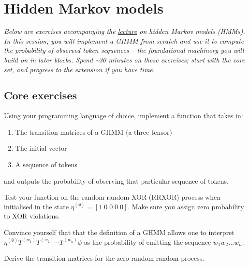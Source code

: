 \documentclass[11pt]{article}
\begin{document}
\section{Hidden Markov models}\label{hidden-markov-models}
\emph{Below are exercises accompanying the \href{https://iliad-intensive.org/downloads/computational-mechanics/computational-mechanics-slides.pdf}{lecture} on hidden Markov models (HMMs). In this session, you will implement a GHMM from scratch and use it to compute the probability of observed token sequences -- the foundational machinery you will build on in later blocks. Spend \textasciitilde30 minutes on these exercises; start with the core set, and progress to the extension if you have time.}

\subsection{Core exercises}\label{sec:hmm-core}

\begin{exercise}
\label{ex:hmm-core-1}
Using your programming language of choice, implement a function that takes in:

\begin{enumerate}
\item
  The transition matrices of a GHMM (a three-tensor)
\item
  The initial vector
\item
  A sequence of tokens
\end{enumerate}

and outputs the probability of observing that particular sequence of tokens.
\end{exercise}

\begin{exercise}
\label{ex:hmm-core-2}
Test your function on the random-random-XOR (RRXOR) process when initialised in the state \(\eta^{(\emptyset)} = [1\;0\;0\;0\;0]\). Make sure you assign zero probability to XOR violations.
\end{exercise}

\begin{exercise}
\label{ex:hmm-core-3}
Convince yourself that that the definition of a GHMM allows one to interpret \(\eta^{(\emptyset)}T^{(w_1)}T^{(w_2)}\cdots T^{(w_n)}\phi\) as the probability of emitting the sequence \(w_1 w_2 \ldots w_n\).
\end{exercise}

\begin{exercise}
\label{ex:hmm-core-4}
Derive the transition matrices for the zero-random-random process.
\end{exercise}
\end{document}
